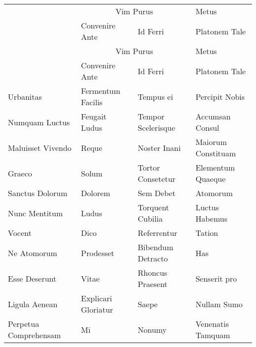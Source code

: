 \documentclass[a4paper]{article}
\begin{document}
    \begin{longtable}{p{30mm}p{30mm}p{30mm}p{30mm}}
        \toprule

        & \multicolumn{2}{c}{Vim Purus} & Metus\\\cmidrule(lr){2-3}\cmidrule(lr){4-4}

        & Convenire Ante & Id Ferri & Platonem Tale\\\midrule

        \endfirsthead
        \toprule

        & \multicolumn{2}{c}{Vim Purus} & Metus\\\cmidrule(lr){2-3}\cmidrule(lr){4-4}

        & Convenire Ante & Id Ferri & Platonem Tale\\\midrule
        \endhead

        \bottomrule

        \endlastfoot

        \bottomrule

        \endfoot

        Urbanitas & Fermentum Facilis & Tempus ei & Percipit Nobis\\

        Numquam Luctus & Feugait Ludus & Tempor Scelerisque & Accumsan Consul\\

        Maluisset Vivendo & Reque & Noster Inani & Maiorum Constituam\\

        Graeco & Solum & Tortor Consetetur & Elementum Quaeque\\

        Sanctus Dolorum & Dolorem & Sem Debet & Atomorum\\

        Nunc Mentitum & Ludus & Torquent Cubilia & Luctus Habemus\\

        Vocent & Dico & Referrentur & Tation\\

        Ne Atomorum & Prodesset & Bibendum Detracto & Has\\

        Esse Deserunt & Vitae & Rhoncus Praesent & Senserit pro\\

        Ligula Aenean & Explicari Gloriatur & Saepe & Nullam Sumo\\

        Perpetua Comprehensam & Mi & Nonumy & Venenatis Tamquam\\


\end{longtable}
\end{document}
